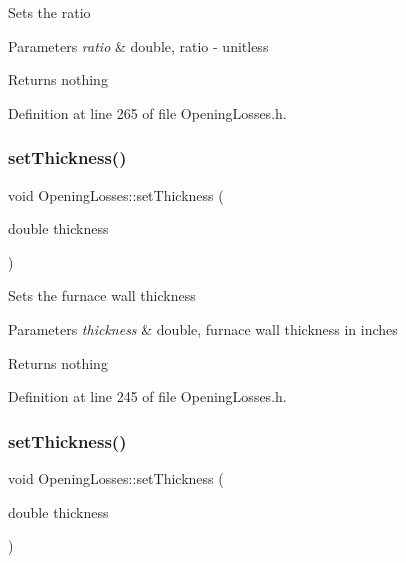 Sets the ratio


\begin{DoxyParams}{Parameters}
{\em ratio} & double, ratio -\/ unitless\\
\hline
\end{DoxyParams}
\begin{DoxyReturn}{Returns}
nothing 
\end{DoxyReturn}


Definition at line 265 of file Opening\+Losses.\+h.

\mbox{\label{class_opening_losses_a221cc88072e4f0975f15c6cd96781dea}} 
\subsubsection{\texorpdfstring{set\+Thickness()}{setThickness()}\hspace{0.1cm}{\footnotesize\ttfamily [1/3]}}
{\footnotesize\ttfamily void Opening\+Losses\+::set\+Thickness (\begin{DoxyParamCaption}\item[{double}]{thickness }\end{DoxyParamCaption})\hspace{0.3cm}{\ttfamily [inline]}}

Sets the furnace wall thickness


\begin{DoxyParams}{Parameters}
{\em thickness} & double, furnace wall thickness in inches\\
\hline
\end{DoxyParams}
\begin{DoxyReturn}{Returns}
nothing 
\end{DoxyReturn}


Definition at line 245 of file Opening\+Losses.\+h.

\mbox{\label{class_opening_losses_a221cc88072e4f0975f15c6cd96781dea}} 
\subsubsection{\texorpdfstring{set\+Thickness()}{setThickness()}\hspace{0.1cm}{\footnotesize\ttfamily [2/3]}}
{\footnotesize\ttfamily void Opening\+Losses\+::set\+Thickness (\begin{DoxyParamCaption}\item[{double}]{thickness }\end{DoxyParamCaption})\hspace{0.3cm}{\ttfamily [inline]}}

